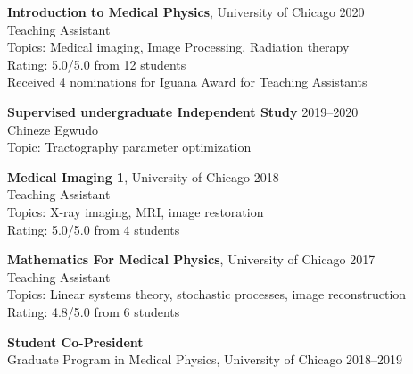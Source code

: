 \documentclass[10pt,letterpaper]{article}
\begin{document}
\begin{etaremune}[labelsep=0.035\textwidth]

\item
  \textbf{Introduction to Medical Physics}, University of Chicago \hfill 2020\\
  Teaching Assistant\\
  Topics: Medical imaging, Image Processing, Radiation therapy\\
  Rating: 5.0/5.0 from 12 students\\
  Received 4 nominations for Iguana Award for Teaching Assistants
\item
  \textbf{Supervised undergraduate Independent Study} \hfill 2019--2020\\
  Chineze Egwudo\\
  Topic: Tractography parameter optimization
  
\item
  \textbf{Medical Imaging 1}, University of Chicago \hfill 2018\\
  Teaching Assistant\\
  Topics: X-ray imaging, MRI, image restoration\\
  Rating: 5.0/5.0 from 4 students
\item
  \textbf{Mathematics For Medical Physics}, University of Chicago \hfill 2017\\
  Teaching Assistant\\
  Topics: Linear systems theory, stochastic processes, image reconstruction\\
  Rating: 4.8/5.0 from 6 students
\end{etaremune}

\begin{etaremune}[labelsep=0.035\textwidth]
\item
  \textbf{Student Co-President}\\
  Graduate Program in Medical Physics, University of Chicago \hfill 2018--2019
\end{etaremune}
\end{document}
